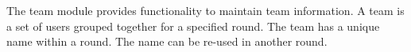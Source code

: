 The team module  provides functionality to maintain team information. A team is a set of users grouped together for a specified round. The team has a unique name within a round. The name can be re-used in another round.